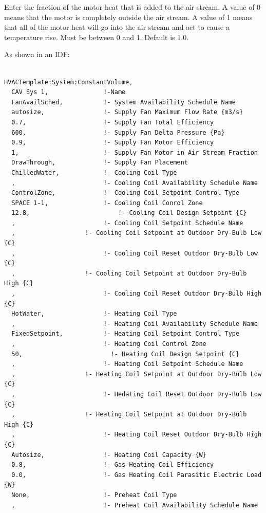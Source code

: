 Enter the fraction of the motor heat that is added to the air stream. A value of 0 means that the motor is completely outside the air stream. A value of 1 means that all of the motor heat will go into the air stream and act to cause a temperature rise. Must be between 0 and 1. Default is 1.0.

As shown in an IDF:

\begin{lstlisting}

HVACTemplate:System:ConstantVolume,
  CAV Sys 1,               !-Name
  FanAvailSched,           !- System Availability Schedule Name
  autosize,                !- Supply Fan Maximum Flow Rate {m3/s}
  0.7,                     !- Supply Fan Total Efficiency
  600,                     !- Supply Fan Delta Pressure {Pa}
  0.9,                     !- Supply Fan Motor Efficiency
  1,                       !- Supply Fan Motor in Air Stream Fraction
  DrawThrough,             !- Supply Fan Placement
  ChilledWater,            !- Cooling Coil Type
  ,                        !- Cooling Coil Availability Schedule Name
  ControlZone,             !- Cooling Coil Setpoint Control Type
  SPACE 1-1,               !- Cooling Coil Conrol Zone
  12.8,                        !- Cooling Coil Design Setpoint {C}
  ,                        !- Cooling Coil Setpoint Schedule Name
  ,                   !- Cooling Coil Setpoint at Outdoor Dry-Bulb Low {C}
  ,                        !- Cooling Coil Reset Outdoor Dry-Bulb Low {C}
  ,                   !- Cooling Coil Setpoint at Outdoor Dry-Bulb High {C}
  ,                        !- Cooling Coil Reset Outdoor Dry-Bulb High {C}
  HotWater,                !- Heating Coil Type
  ,                        !- Heating Coil Availability Schedule Name
  FixedSetpoint,           !- Heating Coil Setpoint Control Type
  ,                        !- Heating Coil Control Zone
  50,                        !- Heating Coil Design Setpoint {C}
  ,                        !- Heating Coil Setpoint Schedule Name
  ,                   !- Heating Coil Setpoint at Outdoor Dry-Bulb Low {C}
  ,                        !- Hedating Coil Reset Outdoor Dry-Bulb Low {C}
  ,                   !- Heating Coil Setpoint at Outdoor Dry-Bulb High {C}
  ,                        !- Heating Coil Reset Outdoor Dry-Bulb High {C}
  Autosize,                !- Heating Coil Capacity {W}
  0.8,                     !- Gas Heating Coil Efficiency
  0.0,                     !- Gas Heating Coil Parasitic Electric Load {W}
  None,                    !- Preheat Coil Type
  ,                        !- Preheat Coil Availability Schedule Name

\end{lstlisting}
